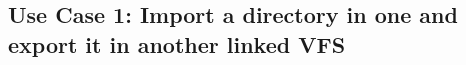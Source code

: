 \documentclass[a4paper,12pt]{article}
\begin{document}

\subsection{Use Case 1: Import a directory in one and export it in another linked VFS}
\end{document}
